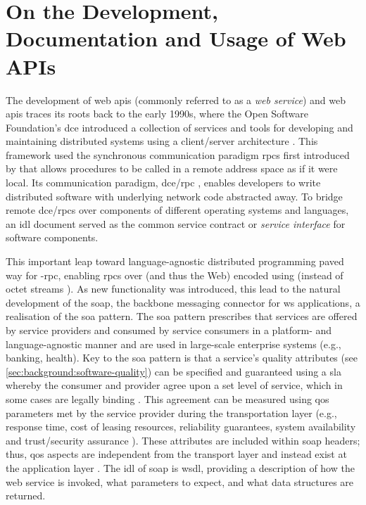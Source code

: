 \graphicspath{{mainmatter/background/figures/}}

\section{On the Development, Documentation and Usage of Web APIs}
\label{ssec:background:api:usage}

The development of web \glspl{api} (commonly referred to as a \textit{web service}) and web \glspl{api} traces its roots back to the early 1990s, where  the Open Software Foundation's \gls{dce} introduced a collection of services and tools for developing and maintaining distributed systems using a client/server architecture \citep{Rosenberry:1992up}. This framework used the synchronous communication paradigm \glspl{rpc} first introduced by \citet{Nelson:1981ue} that allows procedures to be called in a remote address space as if it were local. Its communication paradigm, \gls{dce}/\gls{rpc} \citep{OpenSoftwareFoundation:1991vp}, enables developers to write distributed software with underlying network code abstracted away. To bridge remote \gls{dce}/\glspl{rpc} over components of different operating systems and languages, an \gls{idl} document served as the common service contract or \textit{service interface} for software components. 

This important leap toward language-agnostic distributed programming paved way for -\gls{rpc}, enabling \glspl{rpc} over  (and thus the Web) encoded using  (instead of octet streams \citep{OpenSoftwareFoundation:1991vp}). As new functionality was introduced, this lead to the natural development of the \gls{soap}, the backbone messaging connector for \gls{ws} applications, a realisation of the \gls{soa} \citep{Casati:2003vi} pattern. The \gls{soa} pattern prescribes that services are offered by service providers and consumed by service consumers in a platform- and language-agnostic manner and are used in large-scale enterprise systems (e.g., banking, health). Key to the \gls{soa} pattern is that a service's quality attributes (see \cref{sec:background:software-quality}) can be specified and guaranteed using a \gls{sla} whereby the consumer and provider agree upon a set level of service, which in some cases are legally binding \citep{Bass:2003wi}. This agreement can be measured using \gls{qos} parameters met by the service provider during the transportation layer (e.g., response time, cost of leasing resources, reliability guarantees, system availability and trust/security assurance \citep{Hwang:2017tr,Weerawarana:2005wx}). These attributes are included within \gls{soap} headers; thus, \gls{qos} aspects are independent from the transport layer and instead exist at the application layer \citep{Pautasso2008}. The \gls{idl} of \gls{soap} is \gls{wsdl}, providing a description of how the web service is invoked, what parameters to expect, and what data structures are returned.

